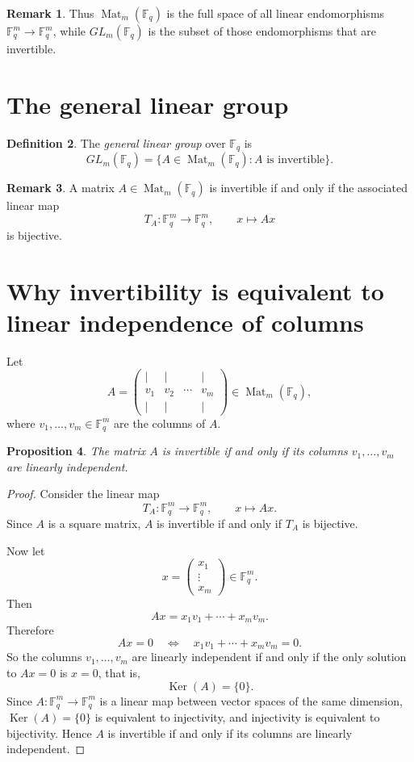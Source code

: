 \documentclass[11pt]{article}
\newcommand{\F}{\mathbb{F}}
\newcommand{\Mat}{\operatorname{Mat}}
\newcommand{\Ker}{\operatorname{Ker}}
\theoremstyle{definition}
\newtheorem{definition}{Definition}[section]
\newtheorem{remark}[definition]{Remark}
\theoremstyle{plain}
\newtheorem{proposition}[definition]{Proposition}
\begin{document}
	\begin{remark}
		Thus \(\Mat_m(\F_q)\) is the full space of all linear endomorphisms \(\F_q^m\to \F_q^m\), while \(GL_m(\F_q)\) is the subset of those endomorphisms that are invertible.
	\end{remark}
	
	\section{The general linear group}
	
	\begin{definition}
		The \emph{general linear group} over \(\F_q\) is
		\[
		GL_m(\F_q)=\{A\in \Mat_m(\F_q): A \text{ is invertible}\}.
		\]
	\end{definition}
	
	\begin{remark}
		A matrix \(A\in \Mat_m(\F_q)\) is invertible if and only if the associated linear map
		\[
		T_A:\F_q^m\to \F_q^m,\qquad x\mapsto Ax
		\]
		is bijective.
	\end{remark}
	
	\section{Why invertibility is equivalent to linear independence of columns}
	
	Let
	\[
	A=
	\begin{pmatrix}
		| & | & & |\\
		v_1 & v_2 & \cdots & v_m\\
		| & | & & |
	\end{pmatrix}
	\in \Mat_m(\F_q),
	\]
	where \(v_1,\dots,v_m\in \F_q^m\) are the columns of \(A\).
	
	\begin{proposition}
		The matrix \(A\) is invertible if and only if its columns \(v_1,\dots,v_m\) are linearly independent.
	\end{proposition}
	
	\begin{proof}
		Consider the linear map
		\[
		T_A:\F_q^m\to \F_q^m,\qquad x\mapsto Ax.
		\]
		Since \(A\) is a square matrix, \(A\) is invertible if and only if \(T_A\) is bijective.
		
		Now let
		\[
		x=
		\begin{pmatrix}
			x_1\\
			\vdots\\
			x_m
		\end{pmatrix}\in \F_q^m.
		\]
		Then
		\[
		Ax=x_1v_1+\cdots+x_mv_m.
		\]
		Therefore
		\[
		Ax=0
		\quad\Longleftrightarrow\quad
		x_1v_1+\cdots+x_mv_m=0.
		\]
		So the columns \(v_1,\dots,v_m\) are linearly independent if and only if the only solution to \(Ax=0\) is \(x=0\), that is,
		\[
		\Ker(A)=\{0\}.
		\]
		Since \(A:\F_q^m\to \F_q^m\) is a linear map between vector spaces of the same dimension, \(\Ker(A)=\{0\}\) is equivalent to injectivity, and injectivity is equivalent to bijectivity. Hence \(A\) is invertible if and only if its columns are linearly independent.
	\end{proof}
	
\end{document}
